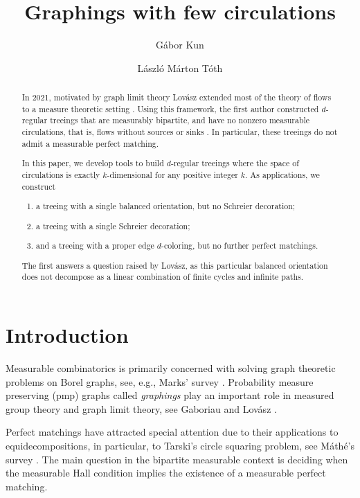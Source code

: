 \documentclass[10pt]{article}
\title{Graphings with few circulations}
\author{
Gábor Kun 
\and 
László Márton Tóth 
}
\date{}
\theoremstyle{plain}
\theoremstyle{remark}
\newcommand{\1}{\mathbbm{1}}
\numberwithin{equation}{section}
\begin{document}
\maketitle
\setcounter{tocdepth}{2}
\begin{abstract} 
In 2021, motivated by graph limit theory Lovász extended most of the theory of flows to a measure theoretic setting \cite{lovasz2021flows}. Using this framework, the first author constructed $d$-regular treeings that are measurably bipartite, and have no nonzero measurable circulations, that is, flows without sources or sinks \cite{kun2021measurable}. In particular, these treeings do not admit a measurable perfect matching. 


In this paper, we develop tools to build $d$-regular treeings where the space of circulations is exactly $ k$-dimensional for any positive integer $k$. As applications, we construct
\begin{enumerate}
    \item a treeing with a single balanced orientation, but no Schreier decoration;
    \item a treeing with a single Schreier decoration;
    \item and a treeing with a proper edge $d$-coloring, but no further perfect matchings.
\end{enumerate}
The first answers a question raised by Lovász, as this particular balanced orientation does not decompose as a linear combination of finite cycles and infinite paths. 
\end{abstract}

\tableofcontents

\newpage
\section{Introduction} \label{sec:intro}

Measurable combinatorics is primarily concerned with solving graph theoretic problems on Borel graphs, see, e.g., Marks' survey \cite{marks2022icm}. Probability measure preserving (pmp) graphs called \emph{graphings} play an important role in measured group theory and graph limit theory, see Gaboriau \cite{gaboriau2010icm} and Lov\'asz \cite{lovasz2012large}. 

Perfect matchings have attracted special attention due to their applications to equidecompositions, in particular, to Tarski's circle squaring problem, see M\'ath\'e's survey \cite{mathe2018icm}.
The main question in the bipartite measurable context is deciding when the measurable Hall condition implies the existence of a measurable perfect matching.
\end{document}
